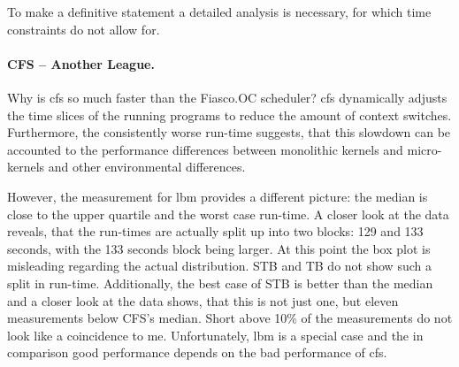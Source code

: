 To make a definitive statement a detailed analysis is necessary, for which time
constraints do not allow for.


\paragraph{CFS -- Another League.}
Why is \gls{cfs} so much faster than the Fiasco.OC scheduler?
\Gls{cfs} dynamically adjusts the time slices of the running programs to reduce
the amount of context switches.
Furthermore, the consistently worse run-time suggests, that this slowdown can
be accounted to the performance differences between monolithic kernels and
micro-kernels and other environmental differences.

However, the measurement for lbm provides a different picture:
the median is close to the upper quartile and the worst case run-time.
A closer look at the data reveals, that the run-times are actually split up
into two blocks: 129 and 133 seconds, with the 133 seconds block being larger.
At this point the box plot is misleading regarding the actual distribution.
STB and TB do not show such a split in run-time.
Additionally, the best case of STB is better than the median and a closer look
at the data shows, that this is not just one, but eleven measurements below
CFS's median.
Short above 10\% of the measurements do not look like a coincidence to me.
Unfortunately, lbm is a special case and the in comparison good performance
depends on the bad performance of \gls{cfs}.



\begin{comment}
\begin{figure}[ht!]
  \begin{subfigure}{.49\textwidth}
    \texttt{[image: images/finalPlots/barcharts/barchart\_solo\_gcc]}
    \caption{SPEC GCC}
    \label{solo:gcc}
  \end{subfigure}
  \begin{subfigure}{.49\textwidth}
    \texttt{[image: images/finalPlots/barcharts/barchart\_solo\_gamess]}
    \caption{SPEC GAMESS}
    \label{solo:gamess}
  \end{subfigure}
  \begin{subfigure}{.49\textwidth}
    \texttt{[image: images/finalPlots/barcharts/barchart\_solo\_lbm]}
    \caption{SPEC LBM}
    \label{solo:lbm}
  \end{subfigure}
  \begin{subfigure}{.49\textwidth}
    \texttt{[image: images/finalPlots/barcharts/barchart\_solo\_mcf]}
    \caption{SPEC MCF}
    \label{solo:mcf}
  \end{subfigure}
  \caption{Solo run-times for each SPEC benchmark and each load balancer.
    Shown is the median over 100 repetitions together with minimum and maximum
    run-time.}
\end{figure}
\end{comment}

